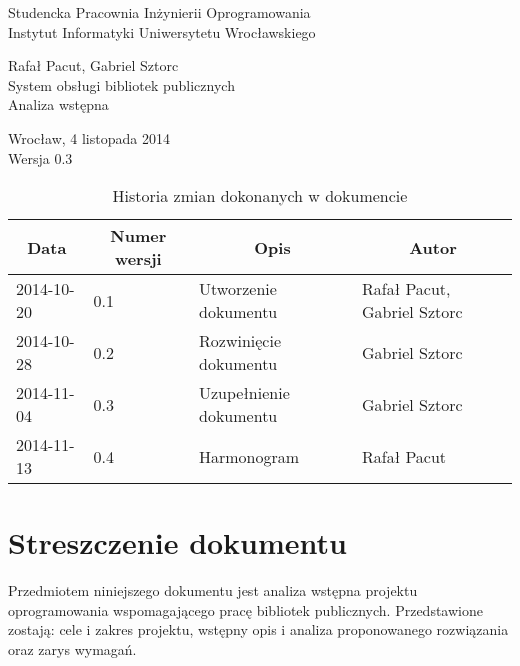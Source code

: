 \documentclass[11pt,a4paper]{article}
\begin{document}
%
%
\begin{center}
	\Large
	Studencka Pracownia Inżynierii Oprogramowania \\[0.5cm]
	Instytut Informatyki Uniwersytetu Wrocławskiego 

	\vspace*{\fill}
	Rafał Pacut, Gabriel Sztorc \\[1cm]
	{\Huge System obsługi bibliotek publicznych} \\[1cm]
	Analiza wstępna
	\vspace*{\fill}

	Wrocław, 4 listopada 2014 \\[0.5cm]
	Wersja 0.3
\end{center}
\newpage
{}
\setcounter{page}{2}
%
%

%
%
\begin{table}
\caption{Historia zmian dokonanych w dokumencie}
\begin{tabular}{|l|l|l|l|}
    \hline
    \multicolumn{1}{|c|}{Data} & \multicolumn{1}{c|}{Numer wersji} & 
        \multicolumn{1}{c|}{Opis} & \multicolumn{1}{c|}{Autor} \\
    \hline \hline
    2014-10-20 & 0.1 & Utworzenie dokumentu & Rafał Pacut, Gabriel Sztorc \\
    \hline
    2014-10-28 & 0.2 & Rozwinięcie dokumentu & Gabriel Sztorc \\
    \hline
    2014-11-04 & 0.3 & Uzupełnienie dokumentu & Gabriel Sztorc \\
    \hline
    2014-11-13 & 0.4 & Harmonogram & Rafał Pacut \\
    \hline
\end{tabular}
\end{table}
%
%

\tableofcontents

\newpage

\setcounter{section}{-1}
\section{Streszczenie dokumentu}
Przedmiotem niniejszego dokumentu jest analiza wstępna projektu oprogramowania
wspomagającego pracę bibliotek publicznych. Przedstawione zostają: cele i
zakres projektu, wstępny opis i analiza proponowanego rozwiązania oraz zarys
wymagań.
\end{document}
